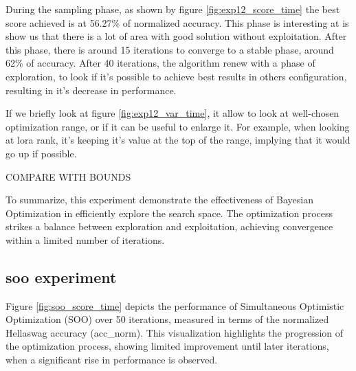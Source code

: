 During the sampling phase, as shown by figure \ref{fig:exp12_score_time} the best score achieved is at 56.27\% of normalized accuracy. This phase is interesting at is show us that there is a lot of area with good solution without exploitation. After this phase, there is around 15 iterations to converge to a stable phase, around 62\% of accuracy. After 40 iterations, the algorithm renew with a phase of exploration, to look if it's possible to achieve best results in others configuration, resulting in it's decrease in performance.

If we briefly look at figure \ref{fig:exp12_var_time}, it allow to look at well-chosen optimization range, or if it can be useful to enlarge it. For example, when looking at \acrshort{lora} rank, it's keeping it's value at the top of the range, implying that it would go up if possible. 

COMPARE WITH BOUNDS


To summarize, this experiment demonstrate the effectiveness of Bayesian Optimization in efficiently explore the search space. The optimization process strikes a balance between exploration and exploitation, achieving convergence within a limited number of iterations.


\subsection{\acrshort{soo} experiment}
\label{sec:soo_exp}

Figure \ref{fig:soo_score_time} depicts the performance of Simultaneous Optimistic Optimization (SOO) over 50 iterations, measured in terms of the normalized Hellaswag accuracy (acc\_norm). This visualization highlights the progression of the optimization process, showing limited improvement until later iterations, when a significant rise in performance is observed.


